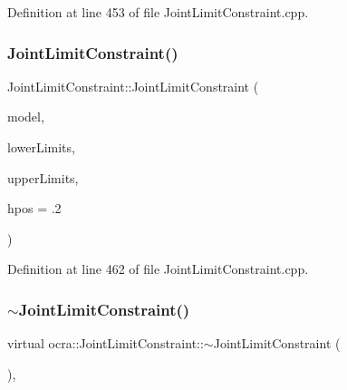 Definition at line 453 of file Joint\+Limit\+Constraint.\+cpp.

\hypertarget{classocra_1_1JointLimitConstraint_a8e767f982c1d41192b03a0aafbd3ced5}{}\label{classocra_1_1JointLimitConstraint_a8e767f982c1d41192b03a0aafbd3ced5} 
\subsubsection{\texorpdfstring{Joint\+Limit\+Constraint()}{JointLimitConstraint()}\hspace{0.1cm}{\footnotesize\ttfamily [2/2]}}
{\footnotesize\ttfamily Joint\+Limit\+Constraint\+::\+Joint\+Limit\+Constraint (\begin{DoxyParamCaption}\item[{const Model \&}]{model,  }\item[{const Eigen\+::\+Vector\+Xd \&}]{lower\+Limits,  }\item[{const Eigen\+::\+Vector\+Xd \&}]{upper\+Limits,  }\item[{double}]{hpos = {\ttfamily .2} }\end{DoxyParamCaption})}



Definition at line 462 of file Joint\+Limit\+Constraint.\+cpp.

\hypertarget{classocra_1_1JointLimitConstraint_a5cb58e4dd8fe8c313a50e8601306e0dd}{}\label{classocra_1_1JointLimitConstraint_a5cb58e4dd8fe8c313a50e8601306e0dd} 
\subsubsection{\texorpdfstring{$\sim$\+Joint\+Limit\+Constraint()}{~JointLimitConstraint()}}
{\footnotesize\ttfamily virtual ocra\+::\+Joint\+Limit\+Constraint\+::$\sim$\+Joint\+Limit\+Constraint (\begin{DoxyParamCaption}{ }\end{DoxyParamCaption})\hspace{0.3cm}{\ttfamily [inline]}, {\ttfamily [virtual]}}



